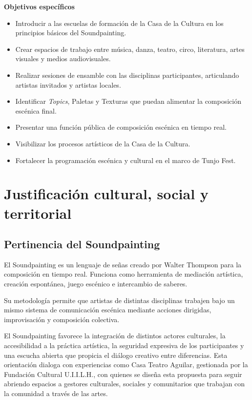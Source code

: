 \documentclass[11pt,a4paper]{article}
\newcommand{\SectionTone}{SectionBlue}
\newcommand{\setsectioncolor}[1]{\renewcommand{\SectionTone}{#1}}
\newcommand{\CurrentTOCSectionTone}{SectionBlue}
\newcommand{\settocsectioncolor}[1]{\gdef\CurrentTOCSectionTone{#1}}
\newcommand{\proposalSection}[2]{%
  \setsectioncolor{#1}%
  \addtocontents{toc}{\protect\settocsectioncolor{#1}\protect\ignorespaces}%
  \section{#2}%
}
\begin{document}
\textbf{Objetivos específicos}

\begin{itemize}
  \item Introducir a las escuelas de formación de la Casa de la Cultura en los principios básicos del Soundpainting.
  \item Crear espacios de trabajo entre música, danza, teatro, circo, literatura, artes visuales y medios audiovisuales.
  \item Realizar sesiones de ensamble con las disciplinas participantes, articulando artistas invitados y artistas locales.
  \item Identificar \textit{Topics}, Paletas y Texturas que puedan alimentar la composición escénica final.
  \item Presentar una función pública de composición escénica en tiempo real.
  \item Visibilizar los procesos artísticos de la Casa de la Cultura.
  \item Fortalecer la programación escénica y cultural en el marco de Tunjo Fest.
\end{itemize}

\proposalSection{SectionTerracotta}{Justificación cultural, social y territorial}

\subsection{Pertinencia del Soundpainting}

El Soundpainting es un lenguaje de señas creado por Walter Thompson para la composición en tiempo real. Funciona como herramienta de mediación artística, creación espontánea, juego escénico e intercambio de saberes.

Su metodología permite que artistas de distintas disciplinas trabajen bajo un mismo sistema de comunicación escénica mediante acciones dirigidas, improvisación y composición colectiva.

El Soundpainting favorece la integración de distintos actores culturales, la accesibilidad a la práctica artística, la seguridad expresiva de los participantes y una escucha abierta que propicia el diálogo creativo entre diferencias. Esta orientación dialoga con experiencias como Casa Teatro Aguilar, gestionada por la Fundación Cultural U.I.I.L.H., con quienes se diseña esta propuesta para seguir abriendo espacios a gestores culturales, sociales y comunitarios que trabajan con la comunidad a través de las artes.
\end{document}
